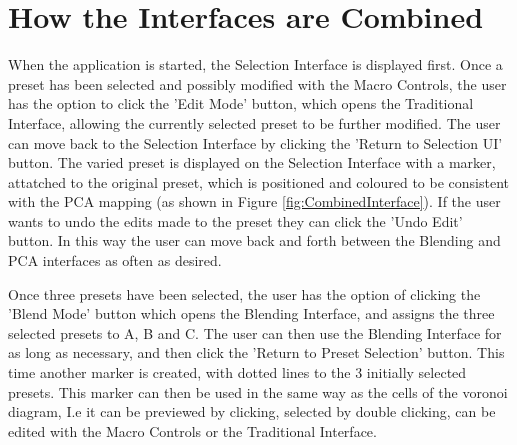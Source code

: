 \documentclass[11pt, oneside]{report}   	%
\begin{document}
\section{How the Interfaces are Combined}
When the application is started, the Selection Interface is displayed first. Once a preset has been selected and possibly modified with the Macro Controls, the user has the option to click the 'Edit Mode' button, which opens the Traditional Interface, allowing the currently selected preset to be further modified. The user can move back to the Selection Interface by clicking the 'Return to Selection UI' button. The varied preset is displayed on the Selection Interface with a marker, attatched to the original preset, which is positioned and coloured to be consistent with the PCA mapping (as shown in Figure \ref{fig:CombinedInterface}). If the user wants to undo the edits made to the preset they can click the 'Undo Edit' button. In this way the user can move back and forth between the Blending and PCA interfaces as often as desired.

Once three presets have been selected, the user has the option of clicking the 'Blend Mode' button which opens the Blending Interface, and assigns the three selected presets to A, B and C. The user can then use the Blending Interface for as long as necessary, and then click the 'Return to Preset Selection' button. This time another marker is created, with dotted lines to the 3 initially selected presets. 
This marker can then be used in the same way as the cells of the voronoi diagram, I.e it can be previewed by clicking, selected by double clicking, can be edited with the Macro Controls or the Traditional Interface.
\end{document}
